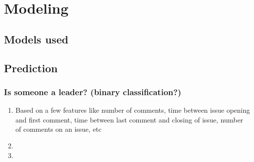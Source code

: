 \section{Modeling}

\subsection{Models used}

\subsection{Prediction}

\subsubsection{Is someone a leader? (binary classification?)}

\begin{enumerate}
\item Based on a few features like number of comments, time between issue opening and first comment, time between last comment and closing of issue, number of comments on an issue, etc
\item \item
\end{enumerate}